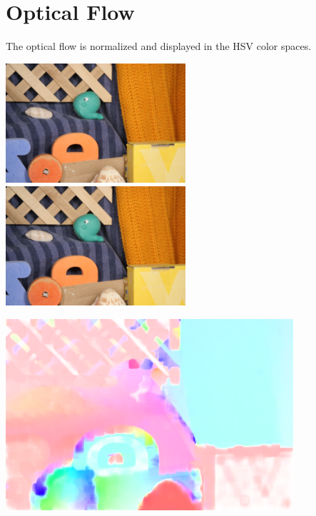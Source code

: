 \documentclass[a4paper]{scrartcl}
\begin{document}
\section{Optical Flow}

The optical flow is normalized and displayed in the HSV color spaces.

\vspace{1cm}
\begin{minipage}{0.8\textwidth}
  \includegraphics[width=0.5\textwidth]{../lab_4_optical_flow/frame10.png}
  \includegraphics[width=0.5\textwidth]{../lab_4_optical_flow/frame11.png}
\end{minipage}

\vspace{1cm}
\begin{minipage}{0.8\textwidth}
  \centering
    \includegraphics[width=0.8\textwidth]{images/optical_flow.png}
\end{minipage}
\end{document}
